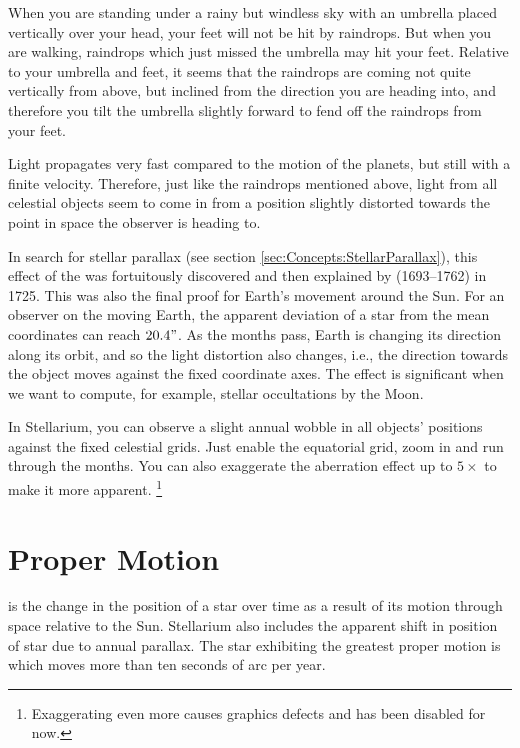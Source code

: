  When you are standing under a rainy but
windless sky with an umbrella placed vertically over your head, your
feet will not be hit by raindrops. But when you are walking, raindrops
which just missed the umbrella may hit your feet. Relative to your
umbrella and feet, it seems that the raindrops are coming not quite
vertically from above, but inclined from the direction you are heading
into, and therefore you tilt the umbrella slightly forward to fend off
the raindrops from your feet.

Light propagates very fast compared to the motion of the planets, but
still with a finite velocity. Therefore, just like the raindrops
mentioned above, light from all celestial objects seem to come in from
a position slightly distorted towards the point in space the observer
is heading to.

In search for stellar parallax (see section \ref{sec:Concepts:StellarParallax}),
this effect of the  was fortuitously
discovered and then explained by  (1693--1762) in
1725. This was also the final proof for Earth's movement around the
Sun. For an observer on the moving Earth, the apparent deviation of a
star from the mean coordinates can reach $20.4"$. As the months pass,
Earth is changing its direction along its orbit, and so the light
distortion also changes, i.e., the direction towards the object moves
against the fixed coordinate axes. The effect is significant when we
want to compute, for example, stellar occultations by the Moon.

In Stellarium, you can observe a slight annual wobble in all objects'
positions against the fixed celestial grids. Just enable the
equatorial grid, zoom in and run through the months. You can also
exaggerate the aberration effect up to $5\times$ to make it more
apparent. \footnote{Exaggerating even more causes graphics defects and
  has been disabled for now.}

\section{Proper Motion}
\label{sec:Concepts:ProperMotion}

 is the change in the position of a star over time as a
result of its motion through space relative to the Sun. Stellarium also 
includes the apparent shift in position of star due to annual parallax.
The star exhibiting the greatest proper motion is  which
moves more than ten seconds of arc per year.

